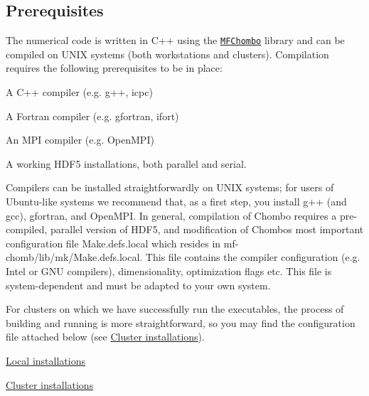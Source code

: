 \subsection*{Prerequisites }

The numerical code is written in C++ using the \href{https://commons.lbl.gov/display/chombo/Chombo+-+Software+for+Adaptive+Solutions+of+Partial+Differential+Equations}{\tt M\+F\+Chombo} library and can be compiled on U\+N\+IX systems (both workstations and clusters). Compilation requires the following prerequisites to be in place\+:


\begin{DoxyEnumerate}
\item A C++ compiler (e.\+g. g++, icpc)
\item A Fortran compiler (e.\+g. gfortran, ifort)
\item An M\+PI compiler (e.\+g. Open\+M\+PI)
\item A working H\+D\+F5 installations, both parallel and serial.
\end{DoxyEnumerate}

Compilers can be installed straightforwardly on U\+N\+IX systems; for users of Ubuntu-\/like systems we recommend that, as a first step, you install g++ (and gcc), gfortran, and Open\+M\+PI. In general, compilation of Chombo requires a pre-\/compiled, parallel version of H\+D\+F5, and modification of Chombo\textquotesingle{}s most important configuration file Make.\+defs.\+local which resides in mf-\/chomb/lib/mk/\+Make.\+defs.\+local. This file contains the compiler configuration (e.\+g. Intel or G\+NU compilers), dimensionality, optimization flags etc. This file is system-\/dependent and must be adapted to your own system.

For clusters on which we have successfully run the executables, the process of building and running is more straightforward, so you may find the configuration file attached below (see \hyperlink{cluster-installations}{Cluster installations}).


\begin{DoxyItemize}
\item \hyperlink{installation__local_8md}{Local installations}
\item \hyperlink{cluster-installations}{Cluster installations} 
\end{DoxyItemize}